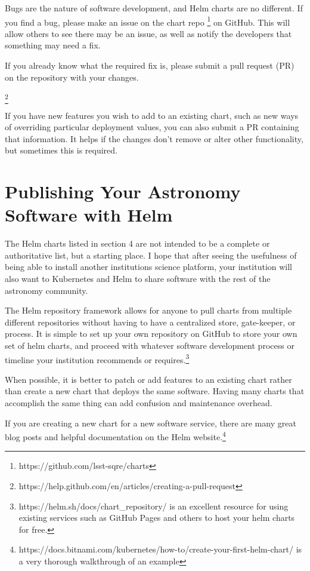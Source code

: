 \documentclass[11pt,twoside]{article}
\begin{document}
Bugs are the nature of software development, and Helm charts are no different.  If you
find a bug, please make an issue on the chart repo \footnote{https://github.com/lsst-sqre/charts}
on GitHub.  This will allow others to see there may be an issue, as well as notify the
developers that something may need a fix.

If you already know what the required fix is, please submit a pull request (PR)
on the repository with your changes.

\footnote{https://help.github.com/en/articles/creating-a-pull-request}

If you have new features you wish to add to an existing chart, such as new ways of overriding
particular deployment values, you can also submit a PR containing that information.  It helps
if the changes don't remove or alter other functionality, but sometimes this is required.

\section{Publishing Your Astronomy Software with Helm}

The Helm charts listed in section 4 are not intended to be a complete or authoritative
list, but a starting place.  I hope that after seeing the usefulness of being able
to install another institutions science platform, your institution will also want to
Kubernetes and Helm to share software with the rest of the astronomy community.

The Helm repository framework allows for anyone to pull charts from multiple different
repositories without having to have a centralized store, gate-keeper, or process.  It is
simple to set up your own repository on GitHub to store your own set of helm charts,
and proceed with whatever software development process or timeline your institution
recommends or requires.\footnote{https://helm.sh/docs/chart\_repository/ is an
excellent resource for using existing services such as GitHub Pages and others
to host your helm charts for free.}

When possible, it is better to patch or add features to an existing chart rather
than create a new chart that deploys the same software.  Having many charts that
accomplish the same thing can add confusion and maintenance overhead.

If you are creating a new chart for a new software service, there are many great
blog posts and helpful documentation on the Helm website.\footnote{https://docs.bitnami.com/kubernetes/how-to/create-your-first-helm-chart/
is a very thorough walkthrough of an example}
\end{document}
